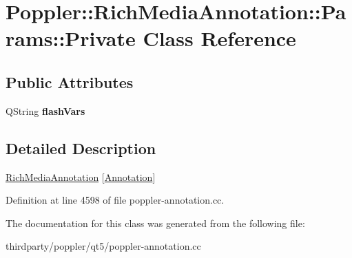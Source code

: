 \hypertarget{class_poppler_1_1_rich_media_annotation_1_1_params_1_1_private}{}\section{Poppler\+:\+:Rich\+Media\+Annotation\+:\+:Params\+:\+:Private Class Reference}
\label{class_poppler_1_1_rich_media_annotation_1_1_params_1_1_private}
\subsection*{Public Attributes}
\begin{DoxyCompactItemize}
\item 
\mbox{\label{class_poppler_1_1_rich_media_annotation_1_1_params_1_1_private_aca446d1cefe1ee92f2a0b7177da92c27}} 
Q\+String {\bfseries flash\+Vars}
\end{DoxyCompactItemize}


\subsection{Detailed Description}
\hyperlink{class_poppler_1_1_rich_media_annotation}{Rich\+Media\+Annotation} \mbox{[}\hyperlink{class_poppler_1_1_annotation}{Annotation}\mbox{]} 

Definition at line 4598 of file poppler-\/annotation.\+cc.



The documentation for this class was generated from the following file\+:\begin{DoxyCompactItemize}
\item 
thirdparty/poppler/qt5/poppler-\/annotation.\+cc\end{DoxyCompactItemize}
